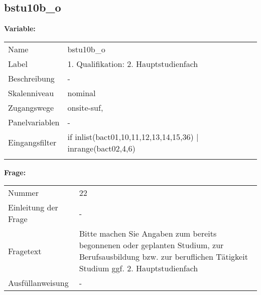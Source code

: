 	
	
	\subsection{bstu10b\_o}
	\label{subSection:bstu10b_o}

	\noindent\textbf{Variable:}\\
		\begin{tabular}{lL{11.3cm}}
			\label{tableVariable:bstu10b_o}
			Name & bstu10b\_o \\
			Label & 1. Qualifikation: 2. Hauptstudienfach \\
			Beschreibung & - \\
			Skalenniveau & nominal \\
			Zugangswege &
				onsite-suf,
 \\
			Panelvariablen & -
			 \\
			Eingangsfilter & if inlist(bact01,10,11,12,13,14,15,36) | inrange(bact02,4,6)  \\
 \\
		\end{tabular}

		\vspace*{1 cm}
		\noindent\textbf{Frage:}\\
		\begin{tabular}{lL{11.3cm}}
			\label{tableQuestion:bstu10b_o}
			Nummer & 22 \\
			Einleitung der Frage & - \\
			Fragetext & Bitte machen Sie Angaben zum bereits begonnenen oder geplanten Studium, zur Berufsausbildung bzw. zur beruflichen Tätigkeit
Studium
ggf. 2. Hauptstudienfach \\
			Ausfüllanweisung & - \\
		\end{tabular}





